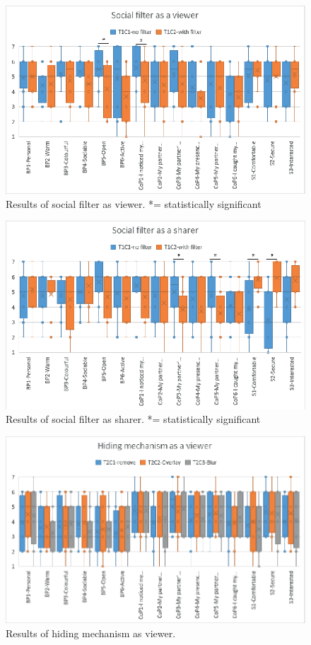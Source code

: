 \begin{figure}
\begin{center}
\includegraphics[width=.8\linewidth]{images/frontier18/images-03.eps}
\caption{Results of social filter as viewer. *= statistically significant}\label{fig:frontier18:result-filter-viewer}
\end{center}
\end{figure}

\begin{figure}
\begin{center}
\includegraphics[width=.8\linewidth]{images/frontier18/images-04.eps}
\caption{Results of social filter as sharer. *= statistically significant}\label{fig:frontier18:result-filter-sharer}
\end{center}
\end{figure}



\begin{figure}
\begin{center}
\includegraphics[width=.9\linewidth]{images/frontier18/images-05.eps}
\caption{Results of hiding mechanism as viewer.}\label{fig:frontier18:result-hiding-viewer}
\end{center}
\end{figure}

